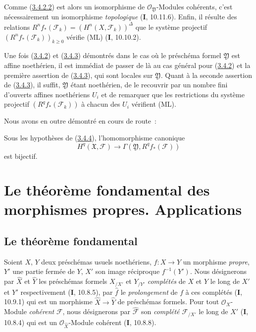 \begin{env}[3.4.5]
Comme (\hyperref[III.3.4.2.2-fr]{3.4.2.2}) est alors un isomorphisme de
$\mathcal O_{\mathfrak Y}$-Modules cohérents, c'est nécessairement un
isomorphisme \emph{topologique} (\textbf{I}, 10.11.6). Enfin, il résulte des relations
$R^nf_*(\mathcal F_k)=(H^n(X,\mathcal F_k))^\Delta$ que le système
projectif $(R^nf_*(\mathcal F_k))_{k\geq0}$ vérifie (ML) (\textbf{I}, 10.10.2).

Une fois (\hyperref[III.3.4.2-fr]{3.4.2}) et
(\hyperref[III.3.4.3-fr]{3.4.3}) démontrés dans le cas où le préschéma formel
$\mathfrak Y$ est affine noethérien, il est immédiat de passer de là au cas
général pour (\hyperref[III.3.4.2-fr]{3.4.2}) et la première assertion de
(\hyperref[III.3.4.3-fr]{3.4.3}), qui sont locales sur $\mathfrak Y$. Quant à
la seconde assertion de (\hyperref[III.3.4.3-fr]{3.4.3}), il suffit,
$\mathfrak Y$ étant noethérien, de le recouvrir par un nombre fini d'ouverts
affines noethériens $U_i$ et de remarquer que les restrictions du système
projectif $(R^qf_*(\mathcal F_k))$ à chacun des $U_i$ vérifient (ML).
\end{env}

Nous avons en outre démontré en cours de route~:

\begin{corollary}[3.4.6]
\label{III.3.4.6-fr}
Sous les hypothèses de \textup{(\hyperref[III.3.4.4-fr]{3.4.4})}, l'homomorphisme
canonique
\[
H^q(\mathfrak X,\mathcal F)
\longrightarrow\Gamma(\mathfrak Y,R^qf_*(\mathcal F))
\tag{3.4.6.1}\label{III.3.4.6.1-fr}
\]
est bijectif.
\end{corollary}

\section{Le théorème fondamental des morphismes propres. Applications}
\label{section:III.4-fr}

\subsection{Le théorème fondamental}
\label{subsection:III.4.1-fr}

\begin{env}[4.1.1]
\label{III.4.1.1-fr}
Soient $X$, $Y$ deux préschémas usuels noethériens, $f:X\to Y$ un
morphisme \emph{propre}, $Y'$ une partie fermée de $Y$, $X'$ son image réciproque
$f^{-1}(Y')$. Nous désignerons par $\widehat X$ et $\widehat Y$ les
préschémas formels $X_{/X'}$ et $Y_{/Y'}$ \emph{complétés} de $X$ et $Y$ le long
de $X'$ et $Y'$ respectivement (\textbf{I}, 10.8.5), par $\widehat f$ le \emph{prolongement}
de $f$ à ces complétés (\textbf{I}, 10.9.1) qui est un morphisme
$\widehat X\to\widehat Y$ de préschémas formels. Pour tout
$\mathcal O_X$-Module \emph{cohérent} $\mathcal F$, nous
désignerons par $\widehat{\mathcal F}$ son \emph{complété} $\mathcal F_{/X'}$ le
long de $X'$ (\textbf{I}, 10.8.4) qui est un $\mathcal O_{\widehat X}$-Module
cohérent (\textbf{I}, 10.8.8).
\end{env}

